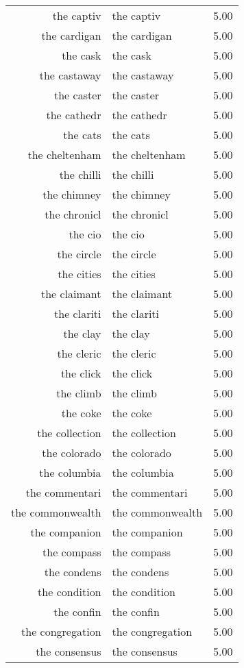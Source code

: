 \begin{table}[ht]
\begin{tabular}{rlr}
  the captiv & the captiv & 5.00 \\ 
  the cardigan & the cardigan & 5.00 \\ 
  the cask & the cask & 5.00 \\ 
  the castaway & the castaway & 5.00 \\ 
  the caster & the caster & 5.00 \\ 
  the cathedr & the cathedr & 5.00 \\ 
  the cats & the cats & 5.00 \\ 
  the cheltenham & the cheltenham & 5.00 \\ 
  the chilli & the chilli & 5.00 \\ 
  the chimney & the chimney & 5.00 \\ 
  the chronicl & the chronicl & 5.00 \\ 
  the cio & the cio & 5.00 \\ 
  the circle & the circle & 5.00 \\ 
  the cities & the cities & 5.00 \\ 
  the claimant & the claimant & 5.00 \\ 
  the clariti & the clariti & 5.00 \\ 
  the clay & the clay & 5.00 \\ 
  the cleric & the cleric & 5.00 \\ 
  the click & the click & 5.00 \\ 
  the climb & the climb & 5.00 \\ 
  the coke & the coke & 5.00 \\ 
  the collection & the collection & 5.00 \\ 
  the colorado & the colorado & 5.00 \\ 
  the columbia & the columbia & 5.00 \\ 
  the commentari & the commentari & 5.00 \\ 
  the commonwealth & the commonwealth & 5.00 \\ 
  the companion & the companion & 5.00 \\ 
  the compass & the compass & 5.00 \\ 
  the condens & the condens & 5.00 \\ 
  the condition & the condition & 5.00 \\ 
  the confin & the confin & 5.00 \\ 
  the congregation & the congregation & 5.00 \\ 
  the consensus & the consensus & 5.00 \\ 

\end{tabular}
\end{table}
